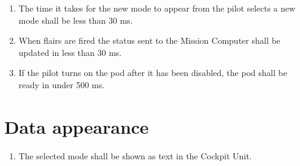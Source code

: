 \documentclass[Main]{subfiles}
\begin{document}
\begin{enumerate}[label= DDD-2.\arabic*:]

\item The time it takes for the new mode to appear from the pilot selects a new mode shall be less than 30 ms.\label{DDD-21}

\item When flairs are fired the status sent to the Mission Computer shall be updated in less than 30 ms.\label{DDD-22}

\item If the pilot turns on the pod after it has been disabled, the pod shall be ready in under 500 ms.\label{DDD-23}

\end{enumerate}




\section{Data appearance}

\begin{enumerate}[label= DDD-3.\arabic*:]

\item The selected mode shall be shown as text in the Cockpit Unit.\label{DDD-31}

\end{enumerate}



%
%
%
\end{document}
